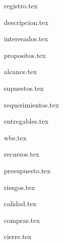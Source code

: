 \documentclass[12pt]{proyecto}
\begin{document}
\maketitle
\thispagestyle{empty}
\pagebreak


\thispagestyle{empty}
{\setlength{\parskip}{0pt}
\tableofcontents{}
}
\pagebreak

{registro.tex}


{descripcion.tex} %

{interesados.tex} %

{propositos.tex}

{alcance.tex} %

{supuestos.tex} %

{requerimientos.tex} %


{entregables.tex} %

{wbs.tex} %

{recursos.tex} %

{presupuesto.tex}
 

{riesgos.tex} %

{calidad.tex} %


{compras.tex} %


{cierre.tex} %
\end{document}
